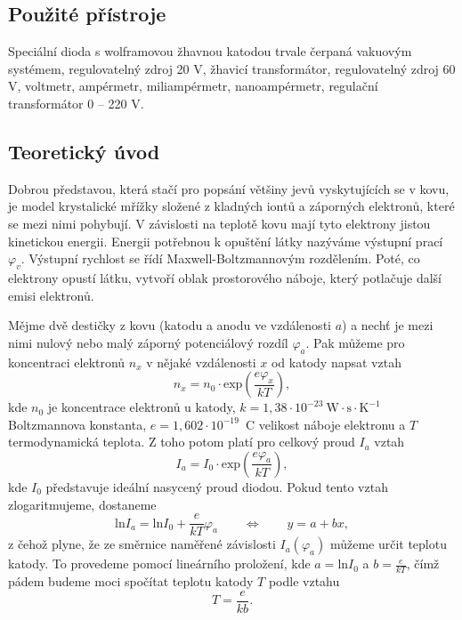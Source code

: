 \documentclass[english]{article}
\begin{document}
	\subsection{Použité přístroje}
		Speciální dioda s wolframovou žhavnou katodou trvale čerpaná vakuovým systémem, regulovatelný zdroj 20 V, žhavicí transformátor, regulovatelný zdroj 60 V, voltmetr, ampérmetr, miliampérmetr, nanoampérmetr, regulační transformátor 0 -- 220 V.
			
	\subsection{Teoretický úvod}
		Dobrou představou, která stačí pro popsání většiny jevů vyskytujících se v kovu, je model krystalické mřížky složené z kladných iontů a záporných elektronů, které se mezi nimi pohybují. V závislosti na teplotě kovu mají tyto elektrony jistou kinetickou energii. Energii potřebnou k opuštění látky nazýváme výstupní prací $\varphi_v$. Výstupní rychlost se řídí Maxwell-Boltzmannovým rozdělením. Poté, co elektrony opustí látku, vytvoří oblak prostorového náboje, který potlačuje další emisi elektronů. 
		
		Mějme dvě destičky z kovu (katodu a anodu ve vzdálenosti $a$) a nechť je mezi nimi nulový nebo malý záporný potenciálový rozdíl $\varphi_a$. Pak můžeme pro koncentraci elektronů $n_x$ v nějaké vzdálenosti $x$ od katody napsat vztah
		\begin{equation}
			n_x = n_0\cdot\mathrm{exp}\left(\frac{e\varphi_x}{kT}\right),
		\end{equation} 
		kde $n_0$ je koncentrace elektronů u katody, $k = 1,38\cdot10^{-23}~\mathrm{W\cdot s \cdot K^{-1}}$ Boltzmannova konstanta, $e=1,602\cdot10^{-19}$~C velikost náboje elektronu a $T$ termodynamická teplota. Z toho potom platí pro celkový proud $I_a$ vztah
		\begin{equation}
			I_a = I_0\cdot\mathrm{exp}\left(\frac{e\varphi_a}{kT}\right),
		\end{equation}
		kde $I_0$ představuje ideální nasycený proud diodou. Pokud tento vztah zlogaritmujeme, dostaneme
		\begin{equation}
			\mathrm{ln}I_a = \mathrm{ln}I_0+\frac{e}{kT}\varphi_a \qquad
			\Leftrightarrow \qquad y=a+bx,
			\label{eq:fit_nabeh}
		\end{equation}
		z čehož plyne, že ze směrnice naměřené závislosti $I_a(\varphi_a)$ můžeme určit teplotu katody. To provedeme pomocí lineárního proložení, kde $a=\mathrm{ln}I_0$ a $b=\frac{e}{kT}$, čímž pádem budeme moci spočítat teplotu katody $T$ podle vztahu
		\begin{equation}
			T=\frac{e}{kb}.
			\label{eq:teplota_nabeh}
		\end{equation}
		
\end{document}
